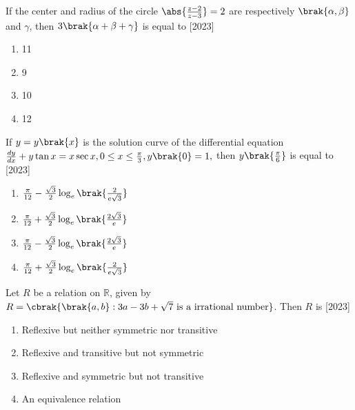 \item If the center and radius of the circle $\abs{\frac{z-2}{z-3}}=2$ are respectively $\brak{\alpha ,\beta}$ and $\gamma$, then $3\brak{\alpha +\beta +\gamma}$ is equal to 
	\hfill{[2023]}
\begin{multicols}{2}
\begin{enumerate}
\item 11
\item 9
\item 10
\item 12
\end{enumerate}
\end{multicols}
\item If $y=y\brak{x}$ is the solution curve of the differential equation $\frac{dy}{dx}+y\tan{x}=x\sec{x}, 0\le x\le \frac{\pi}{3},y\brak{0}=1,$ then $y\brak{\frac{\pi}{6}}$  is equal to
	\hfill{[2023]}
\begin{enumerate}
\item $\frac{\pi}{12}-\frac{\sqrt 3}{2}\log_e\brak{\frac{2}{e\sqrt 3}}$
\item $\frac{\pi}{12}+\frac{\sqrt 3}{2}\log_e\brak{\frac{2\sqrt 3}{e}}$
\item $\frac{\pi}{12}-\frac{\sqrt 3}{2}\log_e\brak{\frac{2\sqrt 3}{e}}$
\item $\frac{\pi}{12}+\frac{\sqrt 3}{2}\log_e\brak{\frac{2}{e\sqrt 3}}$
\end{enumerate}
\item Let $R$ be a relation on $\mathbb{R}$, given by $R=\cbrak{ \brak{a,b}: 3a-3b+\sqrt{7} \text { is a irrational number}}$. Then $R$ is 
	\hfill{[2023]}
\begin{enumerate}
\item Reflexive but neither symmetric nor transitive
\item Reflexive and transitive but not symmetric
\item Reflexive and symmetric but not transitive
\item An equivalence relation
\end{enumerate}	

